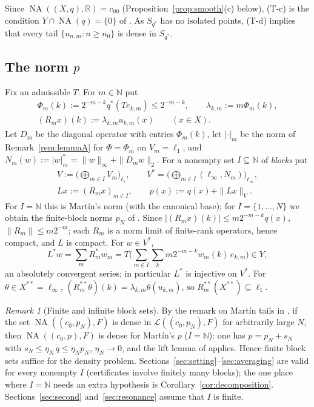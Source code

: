 \documentclass[10pt]{amsart}
\theoremstyle{definition}
\theoremstyle{remark}
\newtheorem{remark}[theorem]{Remark}
\newcommand{\NA}{\operatorname{NA}}
\newcommand{\R}{\mathbb R}
\newcommand{\N}{\mathbb N}
\begin{document}
Since $\NA((X,q),\R)=c_{00}$ (Proposition~\ref{prop:smooth}(c) below),
(T-c) is the condition $Y\cap\NA(q)=\{0\}$ of \cite{Martin}.  As $S_{q^*}$
has no isolated points, (T-d) implies that every tail
$\{u_{n,m}:n\geq n_0\}$ is dense in $S_{q^*}$.

\subsection{The norm $p$}
Fix an admissible $T$.  For $m\in\N$ put
\begin{gather*}
 \Phi_m(k):=2^{-m-k}q^*(Te_{k,m})\le 2^{-m-k},\qquad
 \lambda_{k,m}:=m\Phi_m(k),\\
 (R_mx)(k):=\lambda_{k,m}u_{k,m}(x)\qquad(x\in X).
\end{gather*}
Let $D_m$ be the diagonal operator with entries $\Phi_m(k)$, let
$|\cdot|_m$ be the norm of Remark~\ref{rem:lemmaA} for $\Phi=\Phi_m$ on
$V_m=\ell_1$, and $N_m(w):=|w|_m^*=\|w\|_\infty+\|D_mw\|_2$.  For a nonempty
set $I\subseteq\N$ of \emph{blocks} put
\begin{gather*}
 V:=\Big(\bigoplus_{m\in I}V_m\Big)_{\ell_1},\qquad
 V^*=\Big(\bigoplus_{m\in I}(\ell_\infty,N_m)\Big)_{\ell_\infty},\\
 Lx:=(R_mx)_{m\in I},\qquad p(x):=q(x)+\|Lx\|_V .
\end{gather*}
For $I=\N$ this is Mart\'in's norm (with the canonical base); for
$I=\{1,\dots,N\}$ we obtain the finite-block norms $p_N$ of \cite{PrB}.
Since $|(R_mx)(k)|\le m2^{-m-k}q(x)$, $\|R_m\|\leq m2^{-m}$; each $R_m$ is a
norm limit of finite-rank operators, hence compact, and $L$ is compact.
For $w\in V^*$,
\begin{equation}\label{eq:Lstar}
 L^*w=\sum_mR_m^*w_m=T\Big(\sum_{m\in I}\sum_k m2^{-m-k}w_m(k)\,e_{k,m}\Big)\in Y,
\end{equation}
an absolutely convergent series; in particular $L^*$ is injective on
$V^*$.  For $\theta\in X^{**}=\ell_\infty$,
$(R_m^{**}\theta)(k)=\lambda_{k,m}\theta(u_{k,m})$, so
$R_m^{**}(X^{**})\subseteq\ell_1$.

\begin{remark}[Finite and infinite block sets]\label{rem:blocks}
By the remark on Mart\'in tails in \cite{PrB}, if the set
$\NA((c_0,p_N),F)$ is dense in $\mathcal L((c_0,p_N),F)$ for arbitrarily
large $N$, then
$\NA((c_0,p),F)$ is dense for Mart\'in's $p$ ($I=\N$): one has
$p=p_N+s_N$ with $s_N\le\eta_N\,q\le\eta_Np_N$, $\eta_N\to0$, and the
lift lemma of \cite{PrB} applies.  Hence finite block sets suffice for the
density problem.  Sections~\ref{sec:setting}--\ref{sec:averaging} are
valid for every nonempty $I$ (certificates involve finitely many blocks);
the one place where $I=\N$ needs an extra hypothesis is
Corollary~\ref{cor:decomposition}.  Sections~\ref{sec:second}
and~\ref{sec:resonance} assume that $I$ is finite.
\end{remark}
\end{document}
